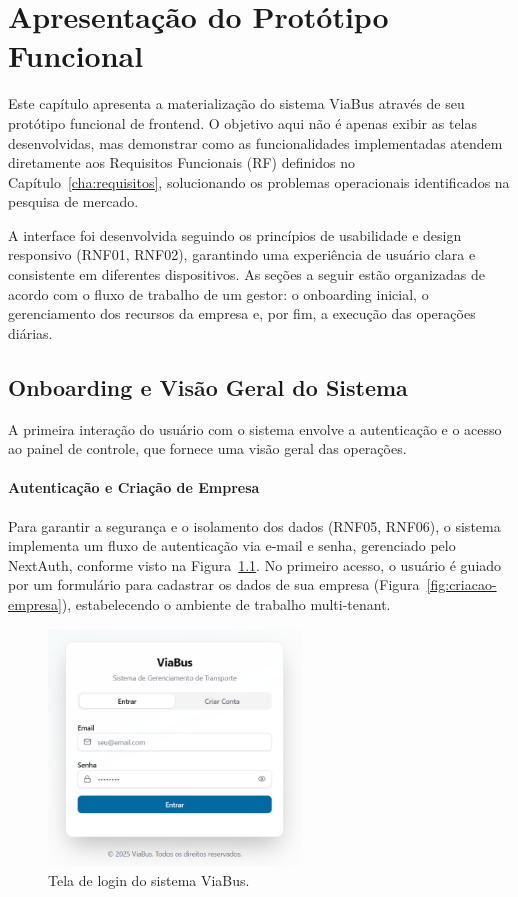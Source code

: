 \chapter{Apresentação do Protótipo Funcional}
\label{cha:funcionalidades}

Este capítulo apresenta a materialização do sistema ViaBus através de seu protótipo funcional de frontend. O objetivo aqui não é apenas exibir as telas desenvolvidas, mas demonstrar como as funcionalidades implementadas atendem diretamente aos Requisitos Funcionais (RF) definidos no Capítulo~\ref{cha:requisitos}, solucionando os problemas operacionais identificados na pesquisa de mercado.

A interface foi desenvolvida seguindo os princípios de usabilidade e design responsivo (RNF01, RNF02), garantindo uma experiência de usuário clara e consistente em diferentes dispositivos. As seções a seguir estão organizadas de acordo com o fluxo de trabalho de um gestor: o onboarding inicial, o gerenciamento dos recursos da empresa e, por fim, a execução das operações diárias.

\section{Onboarding e Visão Geral do Sistema}

A primeira interação do usuário com o sistema envolve a autenticação e o acesso ao painel de controle, que fornece uma visão geral das operações.

\subsubsection{Autenticação e Criação de Empresa}
Para garantir a segurança e o isolamento dos dados (RNF05, RNF06), o sistema implementa um fluxo de autenticação via e-mail e senha, gerenciado pelo NextAuth, conforme visto na Figura~\ref{fig:tela-login}. No primeiro acesso, o usuário é guiado por um formulário para cadastrar os dados de sua empresa (Figura~\ref{fig:criacao-empresa}), estabelecendo o ambiente de trabalho multi-tenant.

\begin{figure}[H]
 \centering
 \includegraphics[width=0.6\textwidth]{imagens/tela-login.png}
 \caption{Tela de login do sistema ViaBus.}
 \label{fig:tela-login}
\end{figure}

